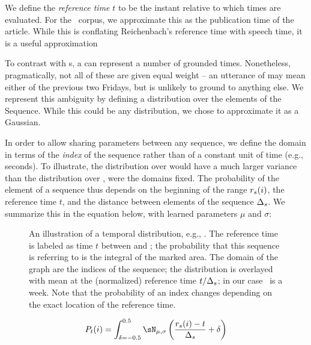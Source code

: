 We define the \textit{reference time} $t$ \cite{key:1947reichenback-temporal}
	to be the instant relative to which times are evaluated.
For the \tempeval\ corpus, we approximate this as the
	publication time of the article.
While this is conflating Reichenbach's reference time with speech time, 
	it is a useful approximation

To contrast with s, a  can represent a number of grounded
	times.
Nonetheless, pragmatically, not all of these are given equal weight --
	an utterance of  may mean either of the previous two Fridays,
	but is unlikely to ground to anything else.
We represent this ambiguity by defining a distribution over the elements
	of the Sequence.
While this could be any distribution, we chose to approximate it as a
	Gaussian.

In order to allow sharing parameters between any sequence, we define the domain
	in terms of the \textit{index} of the sequence rather than
	of a constant unit of time (e.g., seconds).
To illustrate, the distribution over  would have a much larger
	variance than the distribution over , were the domains
	fixed.
The probability of the  element of a sequence thus depends on
	the beginning of the range $r_s(i)$, 
	the reference time $t$, 
	and the distance between elements of the sequence $\Delta_s$.
We summarize this in the equation below, with learned parameters
	$\mu$ and $\sigma$:

\begin{figure}[t]
\begin{center}
	\resizebox{1.1\hsize}{!}{
		
	}
	\caption{
		\label{fig:distribution}
		An illustration of a temporal distribution, e.g., .
		The reference time is labeled as time $t$ between  and 
			; the probability that this sequence is referring to
			 is the integral of the marked area.
		The domain of the graph are the indices of the sequence;
			the distribution is overlayed with mean at the (normalized) reference time
			$t / \Delta_s$; in our case \seqjump\ is a week.
		Note that the probability of an index changes depending on the exact location
		of the reference time.
	}
\end{center}
\end{figure}

\begin{equation}
\label{eqn:gaussian}
	P_t(i) = 
	\int_{\delta=-0.5}^{0.5}
		\sN_{\mu,\sigma}\left(\frac{\seqelem(i) - t}{\seqjump} + \delta \right)
\end{equation}

